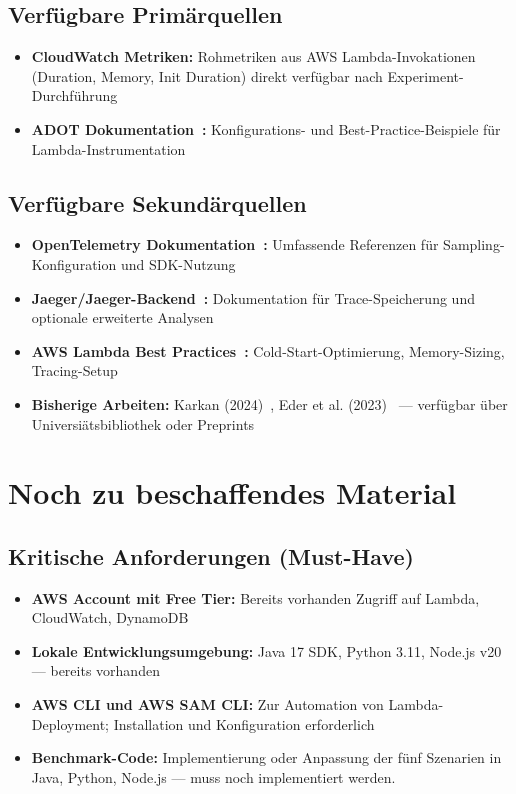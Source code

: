 \subsection{Verfügbare Primärquellen}

\begin{itemize}
    \item \textbf{CloudWatch Metriken:} Rohmetriken aus AWS Lambda-Invokationen (Duration, Memory, Init Duration) direkt verfügbar nach Experiment-Durchführung
    \item \textbf{ADOT Dokumentation~\cite{AWSLambdaBestPractices}:} Konfigurations- und Best-Practice-Beispiele für Lambda-Instrumentation
\end{itemize}

\subsection{Verfügbare Sekundärquellen}

\begin{itemize}
    \item \textbf{OpenTelemetry Dokumentation~\cite{OpenTelemetryDocs}:} Umfassende Referenzen für Sampling-Konfiguration und SDK-Nutzung
    \item \textbf{Jaeger/Jaeger-Backend~\cite{JaegerDocs}:} Dokumentation für Trace-Speicherung und optionale erweiterte Analysen
    \item \textbf{AWS Lambda Best Practices~\cite{AWSLambdaBestPractices}:} Cold-Start-Optimierung, Memory-Sizing, Tracing-Setup
    \item \textbf{Bisherige Arbeiten:} Karkan (2024)~\cite{Karkan2024PerformanceOverhead}, Eder et al. (2023)~\cite{10254754} — verfügbar über Universiätsbibliothek oder Preprints
\end{itemize}

\section{Noch zu beschaffendes Material}

\subsection{Kritische Anforderungen (Must-Have)}

\begin{itemize}
    \item \textbf{AWS Account mit Free Tier:} Bereits vorhanden  Zugriff auf Lambda, CloudWatch, DynamoDB
    \item \textbf{Lokale Entwicklungsumgebung:} Java 17 SDK, Python 3.11, Node.js v20 — bereits vorhanden
    \item \textbf{AWS CLI und AWS SAM CLI:} Zur Automation von Lambda-Deployment; Installation und Konfiguration erforderlich
    \item \textbf{Benchmark-Code:} Implementierung oder Anpassung der fünf Szenarien in Java, Python, Node.js — muss noch implementiert werden.
\end{itemize}

